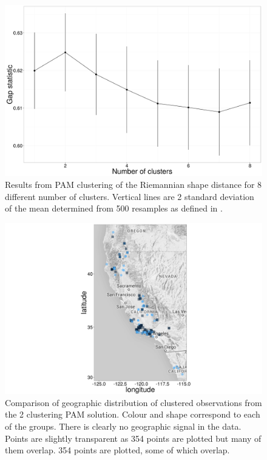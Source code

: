 \documentclass[12pt,letterpaper]{article}
\begin{document}
\begin{figure}[h]
  \centering
  \includegraphics[height = 0.5\textheight, width = \textwidth, keepaspectratio = true]{figure/gap_res}
  \caption{Results from PAM clustering of the Riemannian shape distance for 8 different number of clusters. Vertical lines are 2 standard deviation of the mean determined from 500 resamples as defined in \citep{Tibshirani2001a}.}
  \label{fig:gap}
\end{figure}

\begin{figure}[h]
  \centering
  \includegraphics[height = 0.5\textheight, width = \textwidth, keepaspectratio = true]{figure/gap_map}
  \caption{Comparison of geographic distribution of clustered observations from the 2 clustering PAM solution. Colour and shape correspond to each of the groups. There is clearly no geographic signal in the data. Points are slightly transparent as 354 points are plotted but many of them overlap. 354 points are plotted, some of which overlap.}
  \label{fig:gap_map}
\end{figure}
\end{document}
